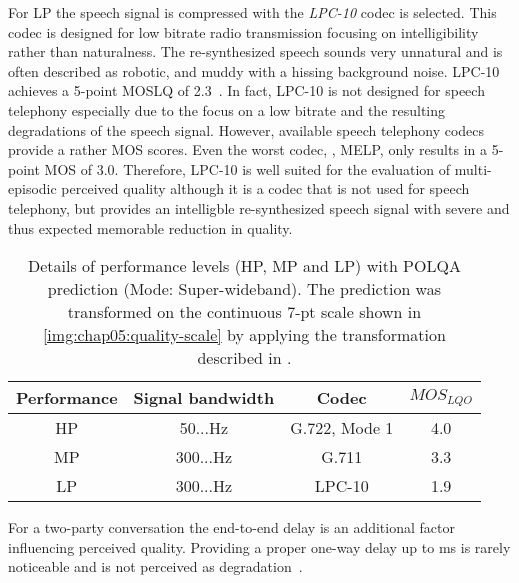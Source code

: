 For \ac{LP} the speech signal is compressed with the \emph{LPC-10} codec is selected. %
This codec is designed for low bitrate radio transmission focusing on intelligibility rather than naturalness.
The re-synthesized speech sounds very unnatural and is often described as robotic, and muddy with a hissing background noise.
LPC-10 achieves a 5-point \ac{MOSLQ} of 2.3~\cite{gibson book}.
In fact, LPC-10 is not designed for speech telephony especially due to the focus on a low bitrate and the resulting degradations of the speech signal.
However, available speech telephony codecs provide a rather \ac{MOS} scores.
Even the worst codec, \ie, \ac{MELP}, only results in a 5-point \ac{MOS} of 3.0. 
Therefore, LPC-10 is well suited for the evaluation of multi-episodic perceived quality although it is a codec that is not used for speech telephony, but provides an intelligble re-synthesized speech signal with severe and thus expected memorable reduction in quality.



\begin{table}
 \centering
 \begin{tabulary}{\columnwidth}{C|C|C|C}
   Performance & Signal bandwidth & Codec & $MOS_{LQO}$ \\
   \midrule
   \ac{HP} & 50...\unit[7000]{Hz}  & G.722, Mode 1 & 4.0 \\ %
   \hline
   \ac{MP} & 300...\unit[3400]{Hz} & G.711         & 3.3 \\ %
   \hline
   \ac{LP} & 300...\unit[3400]{Hz} & LPC-10        & 1.9 \\ %
   \end{tabulary}
   \caption{Details of performance levels (HP, MP and LP) with POLQA prediction (Mode: Super-wideband).
   The prediction was transformed on the continuous 7-pt scale shown in  \autoref{img:chap05:quality-scale} by applying the transformation described in \cite{koster_comparison_2015}.}
   \label{tab:performance}
\end{table}

For a two-party conversation the end-to-end delay is an additional factor influencing perceived quality.
Providing a proper one-way delay up to \unit[100]{ms} is rarely noticeable and is not perceived as degradation~\citep[\cf,][p. 9]{itu-t_g.107:_2005}.





























